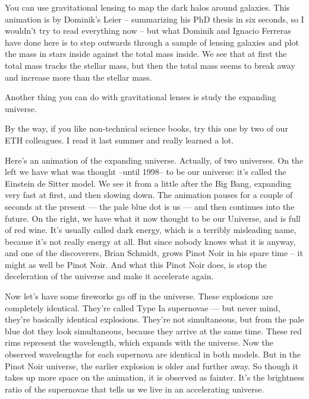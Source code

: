 \next

You can use gravitational lensing to map the dark halos around
galaxies.  This animation is by Dominik's Leier -- summarizing his PhD
thesis in six seconds, so I wouldn't try to read everything now -- but
what Dominik and Ignacio Ferreras have done here is to step outwards
through a sample of lensing galaxies and plot the mass in stars inside
against the total mass inside.  We see that at first the total mass
tracks the stellar mass, but then the total mass seems to break away
and increase more than the stellar mass.

Another thing you can do with gravitational lenses is study the
expanding universe.

\next

By the way, if you like non-technical science books, try this one by
two of our ETH colleagues.  I read it last summer and really learned a
lot.

\next

Here's an animation of the expanding universe.  Actually, of two
universes.  On the left we have what was thought --until 1998-- to be
our universe: it's called the Einstein de Sitter model.  We see it
from a little after the Big Bang, expanding very fast at first, and
then slowing down.  The animation pauses for a couple of seconds at
the present --- the pale blue dot is us --- and then continues into
the future.  On the right, we have what it now thought to be our
Universe, and is full of red wine.  It's usually called dark energy,
which is a terribly misleading name, because it's not really energy at
all.  But since nobody knows what it is anyway, and one of the
discoverers, Brian Schmidt, grows Pinot Noir in his spare time -- it
might as well be Pinot Noir.  And what this Pinot Noir does, is stop
the deceleration of the universe and make it accelerate again.

\next

Now let's have some fireworks go off in the universe.  These
explosions are completely identical.  They're called Type Ia
supernovae --- but never mind, they're basically identical explosions.
They're not simultaneous, but from the pale blue dot they look
simultaneous, because they arrive at the same time.  These red rims
represent the wavelength, which expands with the universe.  Now the
observed wavelengths for each supernova are identical in both models.
But in the Pinot Noir universe, the earlier explosion is older and
further away.  So though it takes up more space on the animation, it
is observed as fainter.  It's the brightness ratio of the supernovae
that tells us we live in an accelerating universe.

